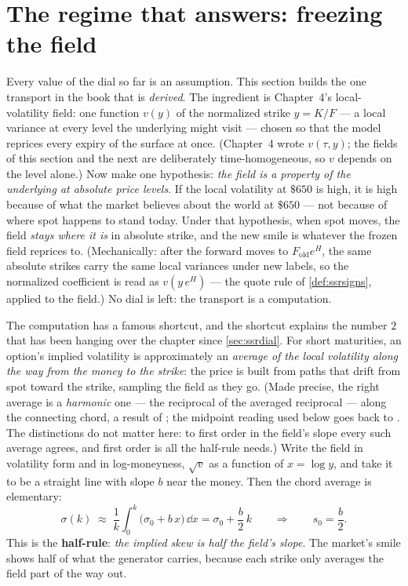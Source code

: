 \section{The regime that answers: freezing the field}
\label{sec:ssrhalf}

Every value of the dial so far is an assumption.  This section builds
the one transport in the book that is \emph{derived}.  The ingredient
is Chapter~4's local-volatility field: one function $v(y)$ of the
normalized strike $y=K/F$ --- a local variance at every level the
underlying might visit --- chosen so that the model reprices every
expiry of the surface at once.  (Chapter~4 wrote $v(\tau,y)$; the
fields of this section and the next are deliberately
time-homogeneous, so $v$ depends on the level alone.)  Now make one
hypothesis: \emph{the field is a property of the underlying at
absolute price levels}.  If the local volatility at $\$650$ is high,
it is high because of what the market believes about the world at
$\$650$ --- not because of where spot happens to stand today.  Under
that hypothesis, when spot moves, the field \emph{stays where it is}
in absolute strike, and the new smile is whatever the frozen field
reprices to.  (Mechanically: after the forward moves to
$F_{\mathrm{old}}e^{H}$, the same absolute strikes carry the same
local variances under new labels, so the normalized coefficient is
read as $v(y\,e^{H})$ --- the quote rule of \cref{def:ssrsigns},
applied to the field.)  No dial is left: the transport is a
computation.

The computation has a famous shortcut, and the shortcut explains the
number $2$ that has been hanging over the chapter since
\cref{sec:ssrdial}.  For short maturities, an option's implied
volatility is approximately an \emph{average of the local volatility
along the way from the money to the strike}: the price is built from
paths that drift from spot toward the strike, sampling the field as
they go.  (Made precise, the right average is a \emph{harmonic} one --- the
reciprocal of the averaged reciprocal --- along the connecting chord,
a result of \citet{BerestyckiBuscaFlorent2002}; the midpoint reading
used below goes back to \citet{HaganKumarLesniewskiWoodward2002}.
The distinctions do not matter here: to first order in the field's
slope every such average agrees, and first order is all the half-rule
needs.)  Write the field in
volatility form and in log-moneyness, $\sqrt{v}$ as a function of
$x=\log y$, and take it to be a straight line with slope $b$ near the
money.  Then the chord average is elementary:
\[
\sigma(k)\;\approx\;\frac{1}{k}\int_{0}^{k}
\big(\sigma_{0}+b\,x\big)\,\dd x
=\sigma_{0}+\frac{b}{2}\,k
\qquad\Longrightarrow\qquad
s_0=\frac{b}{2}.
\]
This is the \textbf{half-rule}: \emph{the implied skew is half the
field's slope}.  The market's smile shows half of what the generator
carries, because each strike only averages the field part of the way
out.

